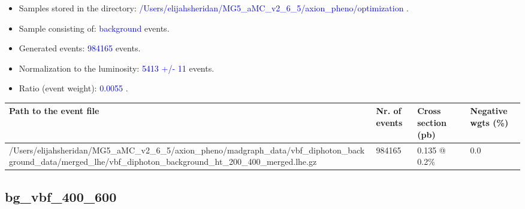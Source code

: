 \documentclass[a4paper, 10pt]{article}
\begin{document}
\begin{itemize}
  \item Samples stored in the directory: \textcolor{blue}{/\-Users/\-elijahsheridan/\-MG5\_aMC\_v2\_6\_5/\-axion\_pheno/\-optimization} .
   \item Sample consisting of: \textcolor{blue}{background}  events.
   \item Generated events: \textcolor{blue}{984165 }  events.
   \item Normalization to the luminosity: \textcolor{blue}{5413}\textcolor{blue}{ +/\-- }\textcolor{blue}{11 }  events.
   \item Ratio (event weight): \textcolor{blue}{0.0055 } .  
 
\end{itemize}
\begin{table}[H]
  \begin{center}
    \begin{tabular}{|m{55.0mm}|m{25.0mm}|m{30.0mm}|m{30.0mm}|}
      \hline
      {\cellcolor{yellow}         Path to the event file}& {\cellcolor{yellow}         Nr. of events}& {\cellcolor{yellow}         Cross section (pb)}& {\cellcolor{yellow}         Negative wgts (\%)}\\
      \hline
      {\cellcolor{white}          /\-Users/\-elijahsheridan/\-MG5\_aMC\_v2\_6\_5/\-axion\_pheno/\-madgraph\_data/\-vbf\_diphoton\_background\_data/\-merged\_lhe/\-vbf\_diphoton\_background\_ht\_200\_400\_merged.lhe.gz}& {\cellcolor{white}          984165}& {\cellcolor{white}          0.135 @ 0.2\%}& {\cellcolor{white}          0.0}\\
\hline
    \end{tabular}
  \end{center}
\end{table}

\subsection{ bg\_vbf\_400\_600}
\end{document}
